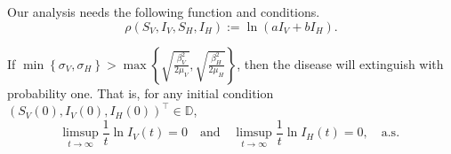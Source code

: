 Our analysis needs the following function and conditions.
\begin{equation}
    \rho (S_V, I_V, S_H, I_H)            := \ln (a I_V + b I_H) .
\end{equation}

\begin{theorem}
    If 
    $
        \displaystyle
        \min
            \left \{
                  \sigma_V, \sigma_H 
            \right\} 
            > 
        \max 
            \left \{
                \sqrt{
                    \frac{\beta_V ^ 2}{2 \mu_V}
                },
                \sqrt{
                    \frac{\beta_H ^ 2}{2 \mu_H}
                }
            \right \}
    $,
        then the disease will extinguish with probability one.  That is,
        for any initial condition 
        $(S_V(0), I_V(0), I_H(0)) ^{\top} \in \mathbb{D}$,
        $$
            \limsup_{t \to \infty} 
                \frac{1}{t} \ln I_V(t) = 0 
                \quad \text{and} \quad
            \limsup_{t \to \infty} 
                \frac{1}{t} \ln I_H(t) = 0, \quad 
                \text{
                   a.s.
                }
        $$
\end{theorem}        
